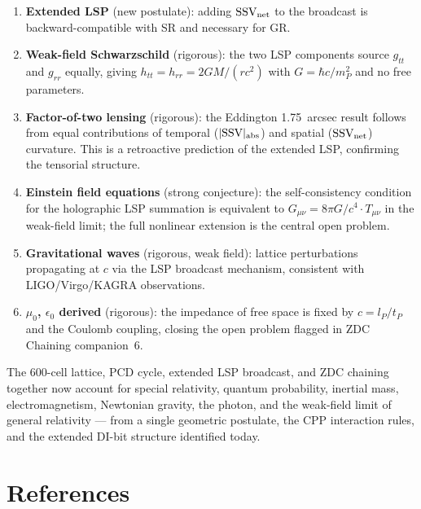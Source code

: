 \documentclass[12pt]{article}
\newcommand{\lP}{l_P}
\newcommand{\tP}{t_P}
\newcommand{\mP}{m_P}
\newcommand{\SSV}{\text{SSV}}
\newcommand{\Gmn}{G_{\mu\nu}}
\newcommand{\Tmn}{T_{\mu\nu}}
\begin{document}
\begin{enumerate}
  \item \textbf{Extended LSP} (new postulate): adding $\mathbf{\SSV}_{\rm net}$
    to the broadcast is backward-compatible with SR and necessary for GR.

  \item \textbf{Weak-field Schwarzschild} (rigorous): the two LSP components
    source $g_{tt}$ and $g_{rr}$ equally, giving $h_{tt} = h_{rr} =
    2GM/(rc^2)$ with $G = \hbar c/\mP^2$ and no free parameters.

  \item \textbf{Factor-of-two lensing} (rigorous): the Eddington 1.75~arcsec
    result follows from equal contributions of temporal ($|\SSV|_{\rm abs}$)
    and spatial ($\mathbf{\SSV}_{\rm net}$) curvature.  This is a retroactive
    prediction of the extended LSP, confirming the tensorial structure.

  \item \textbf{Einstein field equations} (strong conjecture): the
    self-consistency condition for the holographic LSP summation is
    equivalent to $\Gmn = 8\pi G/c^4\cdot\Tmn$ in the weak-field limit;
    the full nonlinear extension is the central open problem.

  \item \textbf{Gravitational waves} (rigorous, weak field): lattice
    perturbations propagating at $c$ via the LSP broadcast mechanism,
    consistent with LIGO/Virgo/KAGRA observations.

  \item \textbf{$\mu_0$, $\epsilon_0$ derived} (rigorous): the impedance
    of free space is fixed by $c = \lP/\tP$ and the Coulomb coupling,
    closing the open problem flagged in ZDC Chaining companion~6.
\end{enumerate}

The 600-cell lattice, PCD cycle, extended LSP broadcast, and ZDC chaining
together now account for special relativity, quantum probability, inertial
mass, electromagnetism, Newtonian gravity, the photon, and the weak-field
limit of general relativity --- from a single geometric postulate, the CPP
interaction rules, and the extended DI-bit structure identified today.

\section*{References}
\end{document}
